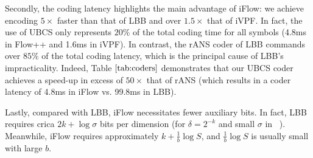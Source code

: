 \documentclass{article}
\begin{document}
Secondly, the coding latency highlights the main advantage of iFlow: we achieve encoding $5 \times$ faster than that of LBB and over $1.5 \times$ that of iVPF. In fact, the use of UBCS only represents $20 \%$ of the total coding time for all symbols (4.8ms in Flow++ and 1.6ms in iVPF).
In contrast, the rANS coder of LBB commands over $85 \%$ of the total coding latency, which is the principal cause of LBB's impracticality. Indeed, Table $\ref{tab:coders}$ demonstrates that our UBCS coder achieves a speed-up in excess of $50 \times$ that of rANS (which results in a coder latency of 4.8ms in iFlow vs. 99.8ms in LBB). 


Lastly, compared with LBB, iFlow necessitates fewer auxiliary bits. In fact, LBB requires crica $2k + \log \sigma$ bits per dimension (for $\delta = 2^{-k}$ and small $\sigma$ in ~\cite{ho2019compression}). Meanwhile, iFlow requires approximately $k + \frac{1}{b} \log S$, and $\frac{1}{b} \log S$ is usually small with large $b$.
\end{document}
